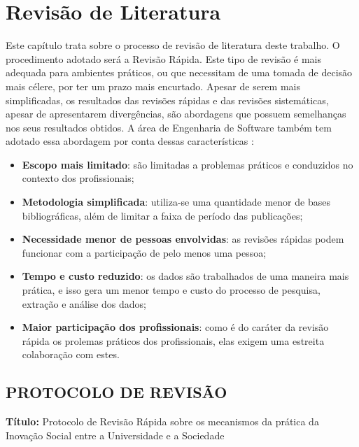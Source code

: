 \chapter{Revisão de Literatura}
\label{chap:revisao}

Este capítulo trata sobre o processo de revisão de literatura deste trabalho. O procedimento adotado será a Revisão Rápida. Este tipo de revisão é mais adequada para ambientes práticos, ou que necessitam de uma tomada de decisão mais célere, por ter um prazo mais encurtado. Apesar de serem mais simplificadas, os resultados das revisões rápidas e das revisões sistemáticas, apesar de apresentarem divergências, são abordagens que possuem semelhanças nos seus resultados obtidos. A área de Engenharia de Software também tem adotado essa abordagem por conta dessas características \cite{cartaxo2020}:

\begin{itemize}
    \item \textbf{Escopo mais limitado}: são limitadas a problemas práticos e conduzidos no contexto dos profissionais;
    \item \textbf{Metodologia simplificada}: utiliza-se uma quantidade menor de bases bibliográficas, além de limitar a faixa de período das publicações;
    \item \textbf{Necessidade menor de pessoas envolvidas}: as revisões rápidas podem funcionar com a participação de pelo menos uma pessoa;
    \item \textbf{Tempo e custo reduzido}: os dados são trabalhados de uma maneira mais prática, e isso gera um menor tempo e custo do processo de pesquisa, extração e análise dos dados;
    \item \textbf{Maior participação dos profissionais}: como é do caráter da revisão rápida os prolemas práticos dos profissionais, elas exigem uma estreita colaboração com estes.
\end{itemize}

\section{PROTOCOLO DE REVISÃO}
\textbf{Título:} Protocolo de Revisão Rápida sobre os mecanismos da prática da Inovação Social entre a Universidade e a Sociedade

\par\vspace{3\baselineskip}


